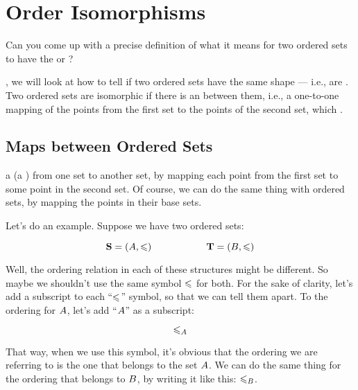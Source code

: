 \documentclass[../../../main.tex]{subfiles}
\begin{document}
\chapter{Order Isomorphisms}
\label{ch:order-isomorphisms}

\begin{ponder}
  Can you come up with a precise definition of what it means for two ordered sets to have the  or ?
\end{ponder}

, we will look at how to tell if two ordered sets have the same shape --- i.e., are . Two ordered sets are isomorphic if there is an  between them, i.e., a one-to-one mapping of the points from the first set to the points of the second set, which .


\section{Maps between Ordered Sets}

 a  (a ) from one set to another set, by mapping each point from the first set to some point in the second set. Of course, we can do the same thing with ordered sets, by mapping the points in their base sets.

Let's do an example. Suppose we have two ordered sets: 

\begin{equation*}
  \struct{S} = (\set{A}, \order/) \hskip 2cm
  \struct{T} = (\set{B}, \order/)
\end{equation*}

Well, the ordering relation in each of these structures might be different. So maybe we shouldn't use the same symbol $\order/$ for both. For the sake of clarity, let's add a subscript to each ``$\order/$'' symbol, so that we can tell them apart. To the ordering for $A$, let's add ``$A$'' as a subscript:

\begin{equation*}
  \order/_{\set{A}}
\end{equation*}

That way, when we use this symbol, it's obvious that the ordering we are referring to is the one that belongs to the set $A$. We can do the same thing for the ordering that belongs to $B$, by writing it like this: $\order/_{\set{B}}$. 
\end{document}
